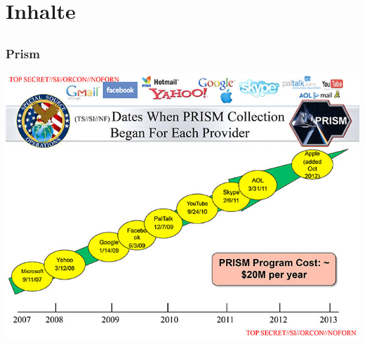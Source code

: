 \documentclass[12pt]{beamer}
\begin{document}
\section{Inhalte}
\subsection{}

\begin{frame}
    \frametitle{Prism}
    \includegraphics[height=0.7\textheight]{img/prism.jpg}
\end{frame}
\end{document}
